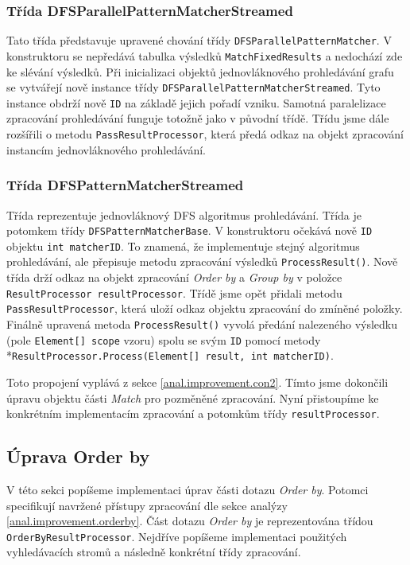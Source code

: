 \subsubsection{Třída DFSParallelPatternMatcherStreamed}

Tato třída představuje upravené chování třídy \texttt{DFSParallelPatternMatcher}.
V konstruktoru se nepředává tabulka výsledků  \texttt{MatchFixedResults} a nedochází zde ke slévání výsledků.
Při inicializaci objektů jednovláknového prohledávání grafu se vytvářejí nově instance třídy \texttt{DFSParallelPatternMatcherStreamed}. 
Tyto instance obdrží nově \texttt{ID} na základě jejich pořadí vzniku.
Samotná paralelizace zpracování prohledávání funguje totožně jako v původní třídě.
Třídu jsme dále rozšířili o metodu \texttt{PassResultProcessor}, která předá odkaz na objekt zpracování instancím jednovláknového prohledávání.

\subsubsection{Třída DFSPatternMatcherStreamed}

Třída reprezentuje jednovláknový DFS algoritmus prohledávání.
Třída je potomkem třídy \texttt{DFSPatternMatcherBase}.
V konstruktoru očekává nově \texttt{ID} objektu \texttt{int matcherID}.
To znamená, že implementuje stejný algoritmus prohledávání, ale přepisuje metodu zpracování výsledků \texttt{ProcessResult()}.
Nově třída drží odkaz na objekt zpracování \textit{Order by} a \textit{Group by} v položce \texttt{ResultProcessor resultProcessor}.
Třídě jsme opět přidali metodu \texttt{PassResultProcessor}, která uloží odkaz objektu zpracování do zmíněné položky.
Finálně upravená metoda \texttt{ProcessResult()} vyvolá předání nalezeného výsledku (pole \texttt{Element[] scope} vzoru) spolu se svým \texttt{ID} pomocí metody \\*\texttt{ResultProcessor.Process(Element[] result, int matcherID)}.

Toto propojení vyplává z sekce \ref{anal.improvement.con2}.
Tímto jsme dokončili úpravu objektu části \textit{Match} pro pozměněné zpracování.
Nyní přistoupíme ke konkrétním implementacím zpracování a potomkům třídy \texttt{resultProcessor}.

\subsection{Úprava Order by}

V této sekci popíšeme implementaci úprav části dotazu \textit{Order by}.
Potomci specifikují navržené přístupy zpracování dle sekce analýzy \ref{anal.improvement.orderby}.
Část dotazu \textit{Order by} je reprezentována třídou \texttt{OrderByResultProcessor}.
Nejdříve popíšeme implementaci použitých vyhledávacích stromů a následně konkrétní třídy zpracování.

